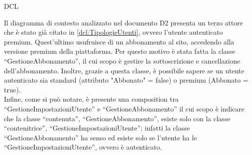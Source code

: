 \begin{listaPersonale}{DCL}
\begin{listaPersonale2}[DCL]{}
        \begin{center}
            
        \end{center}



        Il diagramma di contesto analizzato nel documento D2 presenta un terzo attore che è stato già citato in \ref{dcl:TipologieUtenti}, ovvero l'utente autenticato premium. Quest'ultimo usufruisce di un abbonamento al sito, accedendo alla versione premium della piattaforma. Per questo motivo è stata fatta la classe “GestioneAbbonamento”, il cui scopo è gestire la sottoscrizione e cancellazione dell'abbonamento. Inoltre, grazie a questa classe, è possibile sapere se un utente autenticato sia standard (attributo "Abbonato" = false) o premium (Abbonato = true). \\
        Infine, come si può notare, è presente una composition tra “GestioneImpostazioniUtente” e “GestioneAbbonamento” il cui scopo è indicare che la classe “contenuta”, “GestioneAbbonamento”, esiste solo con la classe “contenitrice”, “GestioneImpostazioniUtente”; infatti la classe “GestioneAbbonamento” ha senso ed esiste solo se l'utente ha le “GestioneImpostazioniUtente”, ovvero è autenticato.


        \begin{center}
            
        \end{center}




\end{listaPersonale2}
\end{listaPersonale}
